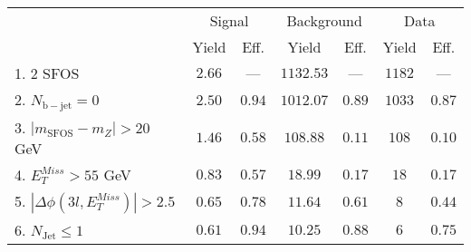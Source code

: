 \begin{tabular}{l||c|c||c|c||c|c}
\hline
 &                 \multicolumn{2}{c||}{Signal}            &  \multicolumn{2}{c||}{Background} &  \multicolumn{2}{c}{Data} \\
   & Yield & Eff. & Yield & Eff. & Yield & Eff.\\
   \hline\hline
   1. 2 SFOS &  $2.66$ &  --- &  $1132.53$ &  --- & $1182$ & ---\\ 
   \hline
   2. $N_{\mathrm{b-jet}}=0$ &  $2.50$ &  $0.94$ &  $1012.07$ &  $0.89$ & $1033$ &  $0.87$\\ 
   \hline
   3. $| m_{\mathrm{SFOS}} - m_Z | >  20$ GeV &  $1.46$ &  $0.58$ &  $108.88$ &  $0.11$ & $108$ &  $0.10$\\ 
   \hline
   4. $E_{T}^{Miss} > 55$ GeV &  $0.83$ &  $0.57$ &  $18.99$ &  $0.17$ & $18$ &  $0.17$\\ 
   \hline
   5. $|\Delta\phi(3l,E_{T}^{Miss})| > 2.5$ &  $0.65$ &  $0.78$ &  $11.64$ &  $0.61$ & $8$ &  $0.44$\\ 
   \hline
   6. $N_{\mathrm{Jet}} \leq 1$ &  $0.61$ &  $0.94$ &  $10.25$ &  $0.88$ & $6$ &  $0.75$\\ 
   \hline
   \end{tabular}


